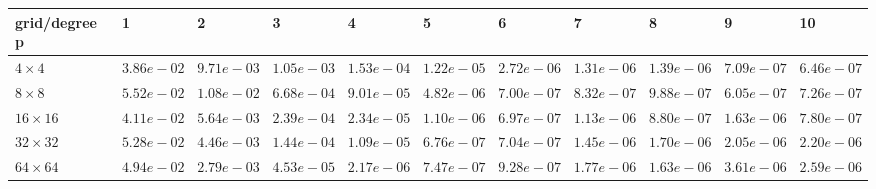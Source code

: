\begin{tabular}{lllllllllll}
\hline
 grid/degree p   & 1          & 2          & 3          & 4          & 5          & 6          & 7          & 8          & 9          & 10         \\
\hline
 $4 \times 4$    & $3.86e-02$ & $9.71e-03$ & $1.05e-03$ & $1.53e-04$ & $1.22e-05$ & $2.72e-06$ & $1.31e-06$ & $1.39e-06$ & $7.09e-07$ & $6.46e-07$ \\
 $8 \times 8$    & $5.52e-02$ & $1.08e-02$ & $6.68e-04$ & $9.01e-05$ & $4.82e-06$ & $7.00e-07$ & $8.32e-07$ & $9.88e-07$ & $6.05e-07$ & $7.26e-07$ \\
 $16 \times 16$  & $4.11e-02$ & $5.64e-03$ & $2.39e-04$ & $2.34e-05$ & $1.10e-06$ & $6.97e-07$ & $1.13e-06$ & $8.80e-07$ & $1.63e-06$ & $7.80e-07$ \\
 $32 \times 32$  & $5.28e-02$ & $4.46e-03$ & $1.44e-04$ & $1.09e-05$ & $6.76e-07$ & $7.04e-07$ & $1.45e-06$ & $1.70e-06$ & $2.05e-06$ & $2.20e-06$ \\
 $64 \times 64$  & $4.94e-02$ & $2.79e-03$ & $4.53e-05$ & $2.17e-06$ & $7.47e-07$ & $9.28e-07$ & $1.77e-06$ & $1.63e-06$ & $3.61e-06$ & $2.59e-06$ \\
\hline
\end{tabular}